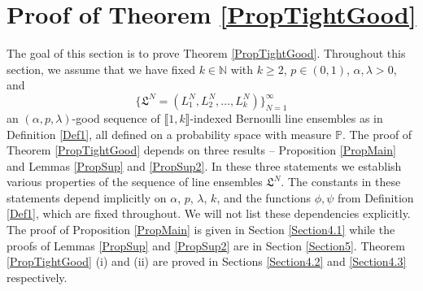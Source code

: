 %
\section{Proof of Theorem \ref{PropTightGood} }\label{Section4}


The goal of this section is to prove Theorem \ref{PropTightGood}. Throughout this section, we assume that we have fixed $k \in \mathbb{N}$ with $k \geq 2$, $p \in (0,1)$, $\alpha, \lambda > 0$, and
\begin{equation*}
\big\{\mathfrak{L}^N = (L^N_1,L^N_2, \dots, L^N_k)\big\}_{N=1}^{\infty}
\end{equation*}
an $(\alpha,p,\lambda)$-good sequence of $\llbracket 1, k\rrbracket$-indexed Bernoulli line ensembles as in Definition \ref{Def1}, all defined on a probability space with measure $\mathbb{P}$. The proof of Theorem \ref{PropTightGood} depends on three results -- Proposition \ref{PropMain} and Lemmas \ref{PropSup} and \ref{PropSup2}. In these three statements we establish various properties of the sequence of line ensembles $\mathfrak{L}^N$. The constants in these statements depend implicitly on $\alpha$, $p$, $\lambda$, $k$, and the functions $\phi, \psi$ from Definition \ref{Def1}, which are fixed throughout. We will not list these dependencies explicitly. The proof of Proposition \ref{PropMain} is given in Section \ref{Section4.1} while the proofs of Lemmas \ref{PropSup} and \ref{PropSup2} are in Section \ref{Section5}. Theorem \ref{PropTightGood} (i) and (ii) are proved in Sections \ref{Section4.2} and \ref{Section4.3} respectively.
%
